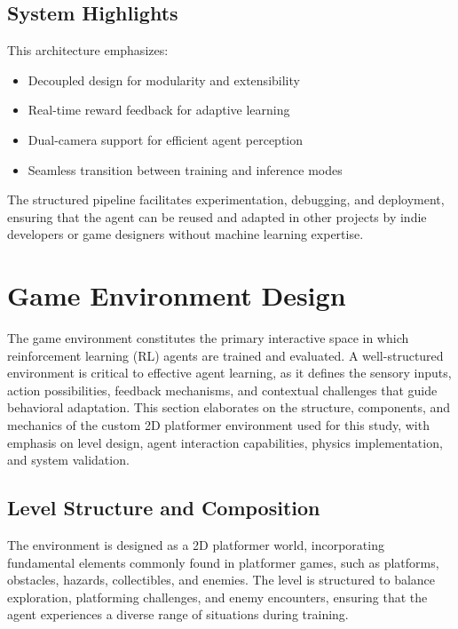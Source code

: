 \documentclass[12pt,oneside,openright,a4paper]{cpe-english-project}
\begin{document}
\subsection{System Highlights}

This architecture emphasizes:
\begin{itemize}
\item Decoupled design for modularity and extensibility
\item Real-time reward feedback for adaptive learning
\item Dual-camera support for efficient agent perception
\item Seamless transition between training and inference modes
\end{itemize}

The structured pipeline facilitates experimentation, debugging, and deployment, ensuring that the agent can be reused and adapted in other projects by indie developers or game designers without machine learning expertise.

\section{Game Environment Design}
The game environment constitutes the primary interactive space in which reinforcement learning (RL) agents are trained and evaluated. A well-structured environment is critical to effective agent learning, as it defines the sensory inputs, action possibilities, feedback mechanisms, and contextual challenges that guide behavioral adaptation. This section elaborates on the structure, components, and mechanics of the custom 2D platformer environment used for this study, with emphasis on level design, agent interaction capabilities, physics implementation, and system validation.
\subsection{Level Structure and Composition}
The environment is designed as a 2D platformer world, incorporating fundamental elements commonly found in platformer games, such as platforms, obstacles, hazards, collectibles, and enemies. The level is structured to balance exploration, platforming challenges, and enemy encounters, ensuring that the agent experiences a diverse range of situations during training.\par
\end{document}
